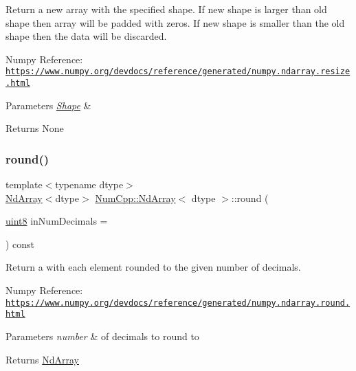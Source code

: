 Return a new array with the specified shape. If new shape is larger than old shape then array will be padded with zeros. If new shape is smaller than the old shape then the data will be discarded.

Numpy Reference\+: \href{https://www.numpy.org/devdocs/reference/generated/numpy.ndarray.resize.html}{\tt https\+://www.\+numpy.\+org/devdocs/reference/generated/numpy.\+ndarray.\+resize.\+html}


\begin{DoxyParams}{Parameters}
{\em \mbox{\hyperlink{class_num_cpp_1_1_shape}{Shape}}} & \\
\hline
\end{DoxyParams}
\begin{DoxyReturn}{Returns}
None 
\end{DoxyReturn}
\mbox{\label{class_num_cpp_1_1_nd_array_a44a74ea32c55394e57b3eec85c366c8e}} 
\subsubsection{\texorpdfstring{round()}{round()}}
{\footnotesize\ttfamily template$<$typename dtype$>$ \\
\mbox{\hyperlink{class_num_cpp_1_1_nd_array}{Nd\+Array}}$<$dtype$>$ \mbox{\hyperlink{class_num_cpp_1_1_nd_array}{Num\+Cpp\+::\+Nd\+Array}}$<$ dtype $>$\+::round (\begin{DoxyParamCaption}\item[{\mbox{\hyperlink{namespace_num_cpp_aee396d0469d6031cd18118c0a45bcdda}{uint8}}}]{in\+Num\+Decimals = {} }\end{DoxyParamCaption}) const\hspace{0.3cm}{\ttfamily [inline]}}

Return a with each element rounded to the given number of decimals.

Numpy Reference\+: \href{https://www.numpy.org/devdocs/reference/generated/numpy.ndarray.round.html}{\tt https\+://www.\+numpy.\+org/devdocs/reference/generated/numpy.\+ndarray.\+round.\+html}


\begin{DoxyParams}{Parameters}
{\em number} & of decimals to round to \\
\hline
\end{DoxyParams}
\begin{DoxyReturn}{Returns}
\mbox{\hyperlink{class_num_cpp_1_1_nd_array}{Nd\+Array}} 
\end{DoxyReturn}
\mbox{\label{class_num_cpp_1_1_nd_array_af150e9b412764425099944c4b3fb0a48}} 
